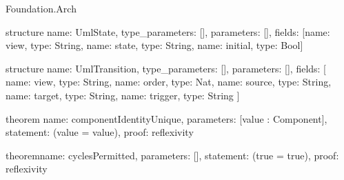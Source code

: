 \begin{lexlean}{Foundation.Arch}
\begin{semanticmodule}
structure{
  name: UmlState,
  type_parameters: [],
  parameters: [],
  fields: [{name: view, type: String}, {name: state, type: String}, {name: initial, type: Bool}]
}

structure{
  name: UmlTransition,
  type_parameters: [],
  parameters: [],
  fields: [
    {name: view, type: String},
    {name: order, type: Nat},
    {name: source, type: String},
    {name: target, type: String},
    {name: trigger, type: String}
  ]
}

theorem{
  name: componentIdentityUnique,
  parameters: [value : Component],
  statement: (value = value),
  proof: reflexivity{}
}

theorem{name: cyclesPermitted, parameters: [], statement: (true = true), proof: reflexivity{}}
\end{semanticmodule}
\end{lexlean}
